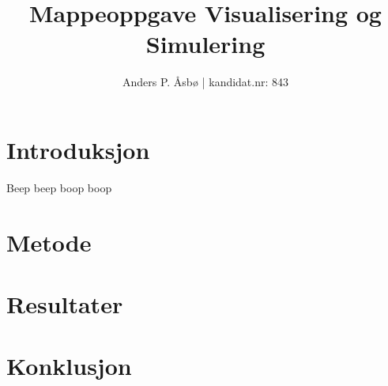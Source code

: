 \documentclass[norsk, stu, 12pt, a4paper]{apa7}  %
\title{Mappeoppgave Visualisering og Simulering}   %
\author{Anders P. Åsbø | kandidat.nr: 843}               %
\affiliation{Høgskolen i Innlandet}
\begin{document}
\maketitle                                %
\tableofcontents

\section{Introduksjon}
Beep beep boop boop \parencite[s.7]{Alexander2016}
\section{Metode}
\section{Resultater}
\section{Konklusjon}

\printbibliography
\end{document}
